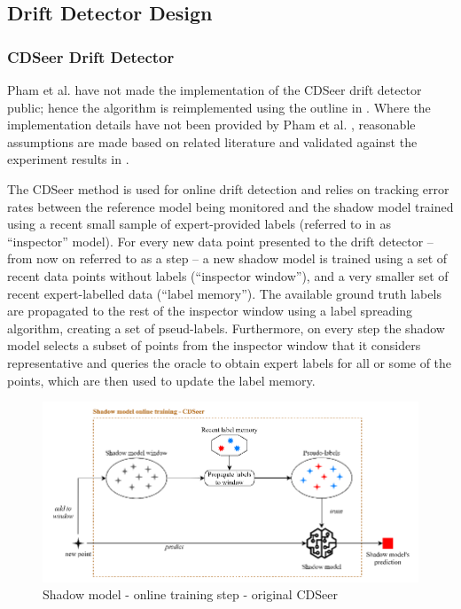 \documentclass{svproc}
\begin{document}
\subsection{Drift Detector Design}

\subsubsection{CDSeer Drift Detector}Pham et al. \cite{pham2025} have not made the implementation of the CDSeer drift detector public; hence the algorithm is reimplemented using the outline in \cite{pham2025}. Where the implementation details have not been provided by Pham et al. \cite{pham2025}, reasonable assumptions are made based on related literature and validated against the experiment results in \cite{pham2025}.

The CDSeer method is used for online drift detection and relies on tracking error rates between the reference model being monitored and the shadow model trained using a recent small sample of expert-provided labels (referred to in \cite{pham2025} as “inspector” model). For every new data point presented to the drift detector – from now on referred to as a step – a new shadow model is trained using a set of recent data points without labels (“inspector window”), and a very smaller set of recent expert-labelled data (“label memory”). The available ground truth labels are propagated to the rest of the inspector window using a label spreading algorithm, creating a set of pseud-labels. Furthermore, on every step the shadow model selects a subset of points from the inspector window that it considers representative and queries the oracle to obtain expert labels for all or some of the points, which are then used to update the label memory.

\begin{figure}
	\centering
	\includegraphics[scale=.6]{figures/Fig4_CDSeerSchema.png}
	\caption{Shadow model - online training step - original CDSeer}
	\label{fig:fig4}
\end{figure}
\end{document}
